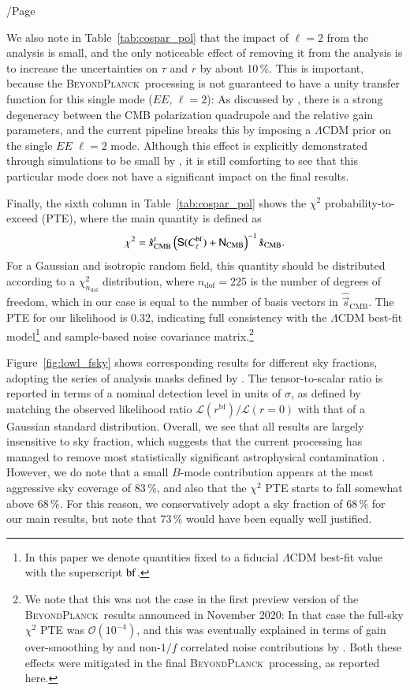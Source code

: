 /Page\documentclass[twocolumn]{aa}
\newcommand{\s}[0]{\vec{s}}
\newcommand{\N}[0]{\tens{N}}
\renewcommand{\S}[0]{\tens{S}}
\newcommand{\BP}{\textsc{BeyondPlanck}}
\begin{document}
We also note in Table~\ref{tab:cospar_pol} that the impact of $\ell=2$
from the analysis is small, and the only noticeable effect of removing
it from the analysis is to increase the uncertainties on $\tau$ and
$r$ by about 10\,\%. This is important, because the \BP\ processing is
not guaranteed to have a unity transfer function for this single mode
($EE$, $\ell=2$): As discussed by \citet{bp07}, there is a strong
degeneracy between the CMB polarization quadrupole and the relative
gain parameters, and the current pipeline breaks this by imposing a
$\Lambda$CDM prior on the single $EE$ $\ell=2$ mode. Although this
effect is explicitly demonstrated through simulations to be small by
\citet{bp04}, it is still comforting to see that this particular mode
does not have a significant impact on the final results.

Finally, the sixth column in Table~\ref{tab:cospar_pol} shows the $\chi^2$
probability-to-exceed (PTE), where the main quantity is defined as
\begin{equation}
  \chi^2 = \hat{\s}_{\mathrm{CMB}}^t
  \left(\S(C_{\ell}^{\mathrm{bf}})+\N_{\mathrm{CMB}}\right)^{-1}\hat{\s}_{\mathrm{CMB}}.
\end{equation}
For a Gaussian and isotropic random field, this quantity should be
distributed according to a $\chi^2_{n_{\mathrm{dof}}}$ distribution,
where $n_{\mathrm{dof}}=225$ is the number of degrees of freedom,
which in our case is equal to the number of basis vectors in
$\hat{\s}_{\mathrm{CMB}}$. The PTE for our likelihood is 0.32,
indicating full consistency with the $\Lambda$CDM best-fit model\footnote{
In this paper we denote quantities fixed to a fiducial $\Lambda$CDM best-fit 
value with the superscript $\rm{bf}$.} 
and sample-based noise covariance matrix.\footnote{We note that this was
  not the case in the first preview version of the \BP\ results
  announced in November 2020: In that case the full-sky $\chi^2$ PTE
  was $\mathcal{O}(10^{-4})$, and this was eventually explained in
  terms of gain over-smoothing by \citet{bp07} and non-$1/f$
  correlated noise contributions by \citet{bp06}. Both these effects
  were mitigated in the final \BP\ processing, as reported here.}

Figure~\ref{fig:lowl_fsky} shows corresponding results for different
sky fractions, adopting the series of analysis masks defined by \citet{planck2016-l05}. The
tensor-to-scalar ratio is reported in terms of a nominal detection
level in units of $\sigma$, as defined by matching the observed
likelihood ratio $\mathcal{L}(r^{\mathrm{bf}})/\mathcal{L}(r=0)$ with
that of a Gaussian standard distribution. Overall, we see that all
results are largely insensitive to sky fraction, which suggests that
the current processing has managed to remove most statistically
significant astrophysical contamination \citep{bp13,bp14}. However, we do
note that a small $B$-mode contribution appears at the most aggressive
sky coverage of 83\,\%, and also that the $\chi^2$ PTE starts to fall
somewhat above 68\,\%. For this reason, we conservatively adopt a sky
fraction of 68\,\% for our main results, but note that 73\,\% would
have been equally well justified. 
\end{document}
